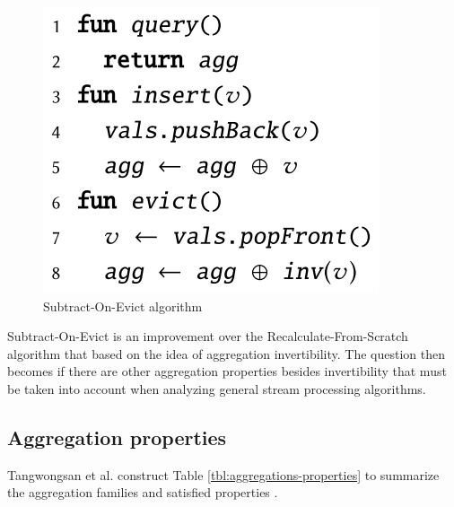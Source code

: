 \begin{figure}[!htb]
    \begin{center}
      \includegraphics[scale=0.45]{figures/soe.png}
      \caption{Subtract-On-Evict algorithm}
      \label{fig:pseudo-soe}
    \end{center}
\end{figure}

Subtract-On-Evict is an improvement over the Recalculate-From-Scratch algorithm that  based on the idea of aggregation invertibility. The question then becomes if there are other aggregation properties besides invertibility that must be taken into account when analyzing general stream processing algorithms.


\subsection{Aggregation properties}
\label{sec:agg-properties}

Tangwongsan et al. construct Table \ref{tbl:aggregations-properties} to summarize the aggregation families and satisfied properties \cite{Tangwongsan-Sliding-Window-Aggregation-Algorithms}.

